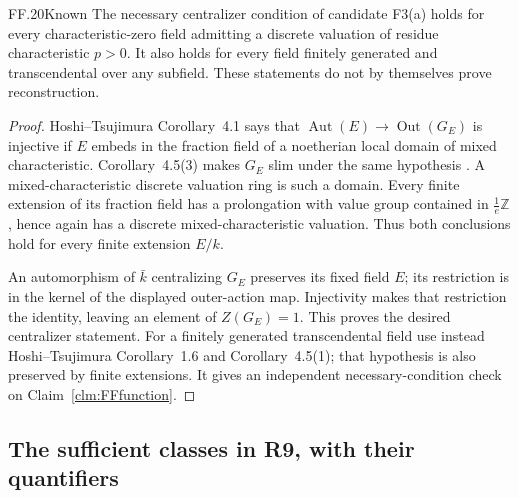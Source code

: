 \begin{claim}{FF.20}{Known}\label{clm:FFmixedcentralizer}
The necessary centralizer condition of candidate F3(a) holds for
every characteristic-zero field admitting a discrete valuation
of residue characteristic \(p>0\). It also holds for every
field finitely generated and transcendental over any subfield.
These statements do not by themselves prove reconstruction.
\end{claim}
\begin{proof}
Hoshi--Tsujimura Corollary~4.1 says that
\(\operatorname{Aut}(E)\to\operatorname{Out}(G_E)\) is
injective if \(E\) embeds in the fraction field of a noetherian
local domain of mixed characteristic. Corollary~4.5(3) makes
\(G_E\) slim under the same hypothesis
\citep{FF_HoshiTsujimura2023}. A mixed-characteristic discrete
valuation ring is such a domain. Every finite extension of its
fraction field has a prolongation with value group contained
in \(\frac1e\mathbb Z\), hence again has a discrete
mixed-characteristic valuation. Thus both conclusions hold
for every finite extension \(E/k\).

An automorphism of \(\bar k\) centralizing \(G_E\) preserves
its fixed field \(E\); its restriction is in the kernel of the
displayed outer-action map. Injectivity makes that restriction
the identity, leaving an element of \(Z(G_E)=1\). This proves
the desired centralizer statement. For a finitely generated
transcendental field use instead Hoshi--Tsujimura Corollary~1.6
and Corollary~4.5(1); that hypothesis is also preserved by finite
extensions. It gives an independent necessary-condition check
on Claim~\ref{clm:FFfunction}.
\end{proof}

\subsection{The sufficient classes in R9, with their quantifiers}


